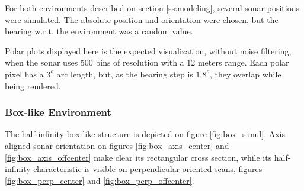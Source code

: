 For both environments described on section \ref{ss:modeling}, several sonar
positions were simulated. The absolute position and orientation were chosen, but
the bearing w.r.t. the environment was a random value.

Polar plots displayed here is the expected visualization, without noise
filtering, when the sonar uses 500 bins of resolution with a 12 meters range.
Each polar pixel has a $3^o$ arc length, but, as the bearing step is $1.8^o$,
they overlap while being rendered.

\subsubsection{Box-like Environment}
The half-infinity box-like structure is depicted on figure
\ref{fig:box_simul}. Axis aligned sonar orientation on figures
\ref{fig:box_axis_center} and \ref{fig:box_axis_offcenter} make clear its
rectangular cross section, while its half-infinity characteristic is visible on
perpendicular oriented scans, figures \ref{fig:box_perp_center} and
\ref{fig:box_perp_offcenter}.


